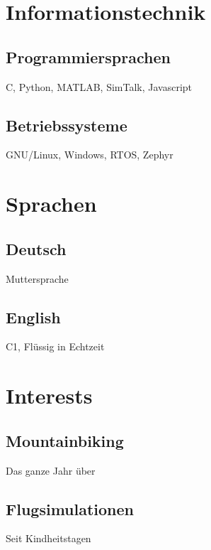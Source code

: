 \documentclass[10pt, a4paper, sans]{moderncv}
\begin{document}
\section{Informationstechnik}
\subsection*{Programmiersprachen}
C, Python, MATLAB, SimTalk, Javascript
\subsection*{Betriebssysteme}
GNU/Linux, Windows, RTOS, Zephyr

\section{Sprachen}
\subsection{Deutsch}
Muttersprache
\subsection{English}
C1, Flüssig in Echtzeit

\section{Interests}
\subsection*{Mountainbiking}
Das ganze Jahr über
\subsection*{Flugsimulationen}
Seit Kindheitstagen
\end{document}
